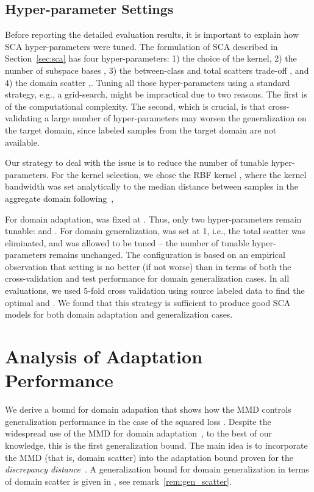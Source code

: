 \documentclass[10pt,journal,compsoc]{IEEEtran}
\begin{document}
\vspace{-1em}
\subsection{Hyper-parameter Settings}
Before reporting the detailed evaluation results, it is important to explain how SCA hyper-parameters were tuned.
The formulation of SCA described in Section~\ref{sec:sca} has four hyper-parameters: 
1) the choice of the kernel,
2) the number of subspace bases ,
3) the between-class and total scatters trade-off , and
4) the domain scatter ,.
Tuning all those hyper-parameters using a standard strategy, e.g., a grid-search, might be impractical due to two reasons.
The first is of the computational complexity.
The second, which is crucial, is that cross-validating a large number of hyper-parameters may worsen the generalization on the target domain, since labeled samples from the target domain are not available.

Our strategy to deal with the issue is to reduce the number of tunable hyper-parameters. 
For the kernel selection, we chose the RBF kernel , where the kernel bandwidth  was set analytically to the median distance between samples in the aggregate domain following~\cite{Gretton:2012aa},

For domain adaptation,  was fixed at . Thus, only two hyper-parameters remain tunable:  and .
For domain generalization,  was set at 1, i.e., the total scatter was eliminated, and  was allowed to be tuned  -- the number of tunable hyper-parameters remains unchanged.
The configuration is based on an empirical observation that setting  is no better (if not worse) than  in terms of both the cross-validation and test performance for domain generalization cases.
In all evaluations, we used 5-fold cross validation using source labeled data to find the optimal  and .
We found that this strategy is sufficient to produce good SCA models for both domain adaptation and generalization cases.



\section{Analysis of Adaptation Performance}
\label{sec:bound}
We derive a bound for domain adapation that shows how the MMD controls generalization performance in the case of the squared loss . 
Despite the widespread use of the MMD for domain adaptation~\cite{DAML:2011,DAM:2012,Long:2013aa,Long2014a,Pan2011}, to the best of our knowledge, this is the first generalization bound. 
The main idea is to incorporate the MMD (that is, domain scatter) into the adaptation bound proven for the \emph{discrepancy distance}~\cite{Mansour2009}. A generalization bound for domain generalization in terms of domain scatter is given in \cite{Muandet2013}, see remark~\ref{rem:gen_scatter}.
\end{document}
